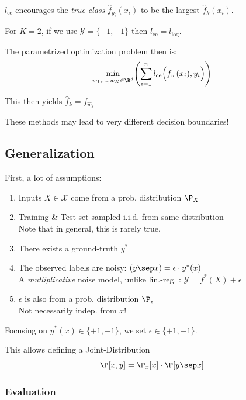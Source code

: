 $l_\text{ce}$ encourages the \textit{true class} $\hat{f}_{y_i}(x_i)$ to be the largest $\hat{f}_k(x_i)$.

{\scriptsize
    \remark For $K=2$, if we use $\mathcal{Y}=\{+1,-1\}$ then $l_\text{ce} = l_\text{log}$.
}

The parametrized optimization problem then is:
$$
    \underset{w_1,\ldots,w_K \in \R^d}{\min}\Biggl( \sum_{i=1}^{n} l_\text{ce}\Bigl( f_w(x_i), y_i \Bigr) \Biggr)
$$

This then yields $\hat{f}_k = f_{\hat{w}_k}$

{\scriptsize
    \remark These methods may lead to very different decision boundaries!
}

\newpage
\subsection{Generalization}

First, a lot of assumptions:
{\small
    \begin{enumerate}
        \item Inputs $X \in \mathcal{X}$ come from a prob. distribution $\P_X$
        \item Training \& Test set sampled i.i.d. from same distribution\\
        {\color{gray} Note that in general, this is rarely true.}
        \item There exists a ground-truth $y^*$
        \item The observed labels are noisy: $(y \sep x) = \epsilon\cdot y^*(x)$\\
        {\color{gray}\scriptsize A \textit{mutliplicative} noise model, unlike lin.-reg. : $\mathcal{Y} = f^*(X) + \epsilon$}
        \item $\epsilon$ is also from a prob. distribution $\P_\epsilon$\\
        {\color{gray} Not necessarily indep. from $x$!}
    \end{enumerate}
}
Focusing on $y^*(x) \in \{+1,-1\}$, we set $\epsilon \in \{+1,-1\}$.\\

This allows defining a Joint-Distribution 
$$
    \P[x,y] = \P_x[x]\cdot\P[y \sep x]
$$

\subsubsection{Evaluation}

